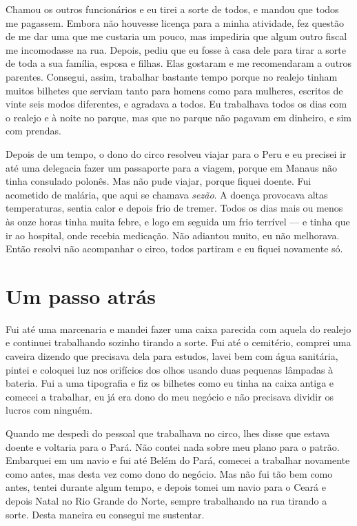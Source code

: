 Chamou os outros funcionários e eu tirei a sorte de todos, e mandou
que todos me pagassem. Embora não houvesse licença para a minha
atividade, fez questão de me dar uma que me custaria um pouco, mas
impediria que algum outro fiscal me incomodasse na rua. Depois, pediu que
eu fosse à casa dele para tirar a sorte de toda a sua família, esposa e
filhas. Elas gostaram e me recomendaram a outros parentes. Consegui, assim,
trabalhar bastante tempo porque no realejo tinham muitos bilhetes que
serviam tanto para homens como para mulheres, escritos de vinte seis
modos diferentes, e agradava a todos. Eu trabalhava
todos os dias com o realejo e à noite no parque, mas que no parque não
pagavam em dinheiro, e sim com prendas.

Depois de um tempo, o dono do circo resolveu viajar para o Peru e eu precisei 
ir até uma delegacia fazer um passaporte para a viagem, porque em
Manaus não tinha consulado polonês. Mas não pude viajar, porque fiquei
doente. Fui acometido de malária, que aqui se chamava \textit{sezão}. A doença
provocava altas temperaturas, sentia calor e depois frio de tremer.
Todos os dias mais ou menos às onze horas tinha muita febre, e logo em
seguida um frio terrível --- e tinha que ir ao hospital, onde recebia
medicação. Não adiantou muito, eu não melhorava. Então resolvi não
acompanhar o circo, todos partiram e eu fiquei novamente só.

\chapter{Um passo atrás}

Fui até uma marcenaria e mandei fazer uma caixa parecida com aquela do
realejo e continuei trabalhando sozinho tirando a sorte. Fui até o
cemitério, comprei uma caveira dizendo que precisava dela para estudos,
lavei bem com água sanitária, pintei e coloquei luz nos orifícios dos
olhos usando duas pequenas lâmpadas à bateria. Fui a uma tipografia e
fiz os bilhetes como eu tinha na caixa antiga e comecei a trabalhar, eu
já era dono do meu negócio e não precisava dividir os lucros com
ninguém.

Quando me despedi do pessoal que trabalhava no circo, lhes disse que
estava doente e voltaria para o Pará. Não contei nada sobre meu plano
para o patrão. Embarquei em um navio e fui até Belém do Pará, comecei a
trabalhar novamente como antes, mas desta vez como dono do negócio. Mas
não fui tão bem como antes, tentei durante algum tempo, e depois tomei
um navio para o Ceará e depois Natal no Rio Grande do Norte, sempre
trabalhando na rua tirando a sorte. Desta maneira eu consegui me
sustentar.

